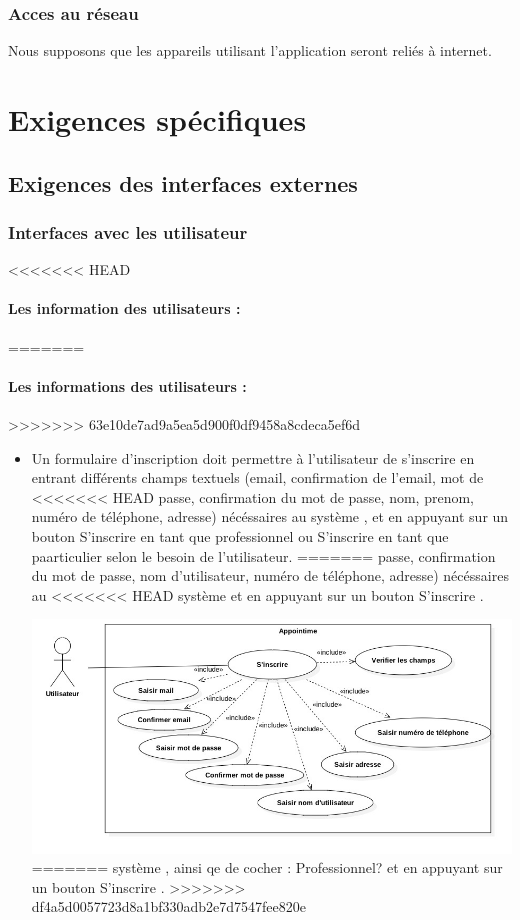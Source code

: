 \documentclass{article}
\begin{document}
\begin{itemize}
\subsubsection{Acces au réseau}
Nous supposons que les appareils utilisant l'application seront reliés à internet.

\section{Exigences spécifiques}
\subsection{Exigences des interfaces externes}
\subsubsection{Interfaces avec les utilisateur}
<<<<<<< HEAD
\paragraph{Les information des utilisateurs :}
=======
\paragraph{Les informations des utilisateurs :}
>>>>>>> 63e10de7ad9a5ea5d900f0df9458a8cdeca5ef6d
\begin{itemize}
 \item Un formulaire d'inscription doit permettre à l'utilisateur de
   s'inscrire en entrant différents champs textuels (email,
   confirmation de l'email, mot de
<<<<<<< HEAD
   passe, confirmation du mot de passe, nom, prenom, numéro de téléphone, adresse) nécéssaires au
   système , et en appuyant sur
   un bouton \og S'inscrire en tant que professionnel\fg{} ou \og S'inscrire en tant que paarticulier\fg{} selon le besoin de l'utilisateur.
=======
   passe, confirmation du mot de passe, nom d'utilisateur, numéro de téléphone, adresse) nécéssaires au
<<<<<<< HEAD
   système et en appuyant sur
   un bouton \og S'inscrire \fg{}.

\includegraphics[scale=0.5]{ShematDiagrammes/useCaseInscription.jpg}
=======
   système , ainsi qe de cocher : \og Professionnel? \fg{} et en appuyant sur
   un bouton \og S'inscrire \fg{}.
>>>>>>> df4a5d0057723d8a1bf330adb2e7d7547fee820e


\end{itemize}
\end{itemize}
\end{document}
